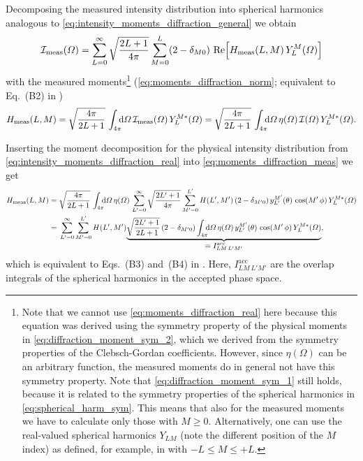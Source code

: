 Decomposing the measured intensity distribution into spherical
harmonics analogous to \cref{eq:intensity_moments_diffraction_general}
we obtain
\begin{equation}
  \mathcal{I}_\text{meas}(\Omega)
  = \sum_{L = 0}^\infty \sqrt{\frac{2 L + 1}{4 \pi}} \sum_{M = 0}^{L} (2 - \delta_{M 0})\, \Re\!\sBrk{H_\text{meas}(L, M)\, Y_L^M(\Omega)}
\end{equation}
with the measured
moments\footnote{\label{fn:complex_moment_decomp}Note that we cannot
use \cref{eq:moments_diffraction_real} here because this equation was
derived using the symmetry property of the physical moments in
\cref{eq:diffraction_moment_sym_2}, which we derived from the symmetry
properties of the Clebsch-Gordan coefficients.  However, since
$\eta(\Omega)$ can be an arbitrary function, the measured moments do
in general not have this symmetry property.  Note that
\cref{eq:diffraction_moment_sym_1} still holds, because it is related
to the symmetry properties of the spherical harmonics in
\cref{eq:spherical_harm_sym}.  This means that also for the measured
moments we have to calculate only those with $M \geq 0$.
Alternatively, one can use the real-valued spherical harmonics $Y_{L
M}$ (note the different position of the $M$ index) as defined, for
example, in  with $-L
\leq M \leq +L$.} (\confer \cref{eq:moments_diffraction_norm};
equivalent to Eq.~(B2) in )
\begin{equation}
  \label{eq:moments_diffraction_meas}
  H_\text{meas}(L, M)
  = \sqrt{\frac{4 \pi}{2 L + 1}}\, \int_{4 \pi}\!\!\! \dif{\Omega}\, \mathcal{I}_\text{meas}(\Omega)\, Y_L^{M *}(\Omega)
  = \sqrt{\frac{4 \pi}{2 L + 1}}\, \int_{4 \pi}\!\!\! \dif{\Omega}\, \eta(\Omega)\, \mathcal{I}(\Omega)\, Y_L^{M *}(\Omega).
\end{equation}

Inserting the moment decomposition for the physical intensity distribution
from \cref{eq:intensity_moments_diffraction_real} into
\cref{eq:moments_diffraction_meas} we get
\begin{align}
  H_\text{meas}(L, M)
  ={}& \sqrt{\frac{4 \pi}{2 L + 1}}\, \int_{4 \pi}\!\!\! \dif{\Omega}\, \eta(\Omega)\,
  \sum_{L' = 0}^\infty \sqrt{\frac{2 L' + 1}{4 \pi}} \sum_{M' = 0}^{L'} H(L', M')\, (2 - \delta_{M' 0})\, y_{L'}^{M'}(\theta)\, \cos(M'\, \phi)\,
  Y_L^{M *}(\Omega) \notag \\
  \label{eq:moments_diffraction_meas2}
  ={}& \sum_{L' = 0}^\infty \sum_{M' = 0}^{L'} H(L', M')
  \dUnderbrace{\sqrt{\frac{2 L' + 1}{2 L + 1}}\, (2 - \delta_{M' 0}) \int_{4 \pi}\!\!\! \dif{\Omega}\, \eta(\Omega)\,
  y_{L'}^{M'}(\theta)\, \cos(M'\, \phi)\, Y_L^{M *}(\Omega)}{\equiv I^\text{acc}_{L M\, L' M'}},
\end{align}
which is equivalent to Eqs.~(B3) and~(B4) in .
Here, $I^\text{acc}_{L M\, L' M'}$ are the overlap integrals of the
spherical harmonics in the accepted phase space.

